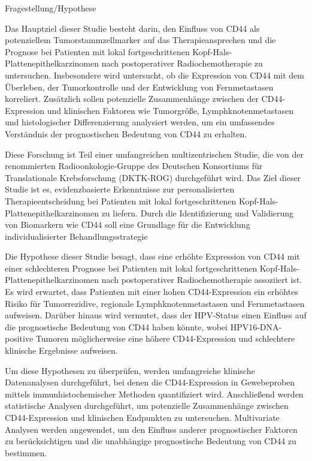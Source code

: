 Fragestellung/Hypothese

Das Hauptziel dieser Studie besteht darin, den Einfluss von CD44 als potenziellem Tumorstammzellmarker auf das Therapieansprechen und die Prognose bei Patienten mit lokal fortgeschrittenen Kopf-Hals-Plattenepithelkarzinomen nach postoperativer Radiochemotherapie zu untersuchen. Insbesondere wird untersucht, ob die Expression von CD44 mit dem Überleben, der Tumorkontrolle und der Entwicklung von Fernmetastasen korreliert. Zusätzlich sollen potenzielle Zusammenhänge zwischen der CD44-Expression und klinischen Faktoren wie Tumorgröße, Lymphknotenmetastasen und histologischer Differenzierung analysiert werden, um ein umfassendes Verständnis der prognostischen Bedeutung von CD44 zu erhalten.

Diese Forschung ist Teil einer umfangreichen multizentrischen Studie, die von der renommierten Radioonkologie-Gruppe des Deutschen Konsortiums für Translationale Krebsforschung (DKTK-ROG) durchgeführt wird. Das Ziel dieser Studie ist es, evidenzbasierte Erkenntnisse zur personalisierten Therapieentscheidung bei Patienten mit lokal fortgeschrittenen Kopf-Hals-Plattenepithelkarzinomen zu liefern. Durch die Identifizierung und Validierung von Biomarkern wie CD44 soll eine Grundlage für die Entwicklung individualisierter Behandlungsstrategie

Die Hypothese dieser Studie besagt, dass eine erhöhte Expression von CD44 mit einer schlechteren Prognose bei Patienten mit lokal fortgeschrittenen Kopf-Hals-Plattenepithelkarzinomen nach postoperativer Radiochemotherapie assoziiert ist. Es wird erwartet, dass Patienten mit einer hohen CD44-Expression ein erhöhtes Risiko für Tumorrezidive, regionale Lymphknotenmetastasen und Fernmetastasen aufweisen. Darüber hinaus wird vermutet, dass der HPV-Status einen Einfluss auf die prognostische Bedeutung von CD44 haben könnte, wobei HPV16-DNA-positive Tumoren möglicherweise eine höhere CD44-Expression und schlechtere klinische Ergebnisse aufweisen.

Um diese Hypothesen zu überprüfen, werden umfangreiche klinische Datenanalysen durchgeführt, bei denen die CD44-Expression in Gewebeproben mittels immunhistochemischer Methoden quantifiziert wird. Anschließend werden statistische Analysen durchgeführt, um potenzielle Zusammenhänge zwischen CD44-Expression und klinischen Endpunkten zu untersuchen. Multivariate Analysen werden angewendet, um den Einfluss anderer prognostischer Faktoren zu berücksichtigen und die unabhängige prognostische Bedeutung von CD44 zu bestimmen.

